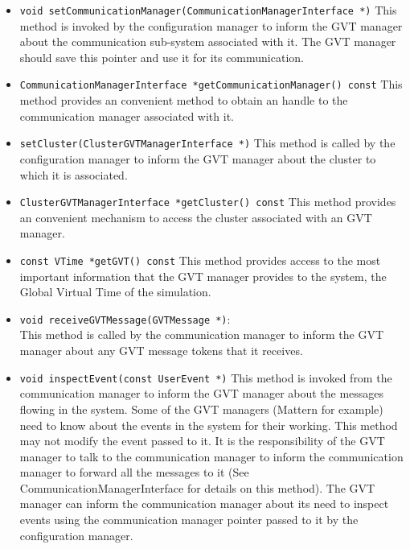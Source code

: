 \begin{itemize}
\item {\tt void setCommunicationManager(CommunicationManagerInterface *)}
  This method is invoked by the configuration manager to inform the GVT
  manager about the communication sub-system associated with it. The GVT
  manager should save this pointer and use it for its communication.

\item {\tt CommunicationManagerInterface *getCommunicationManager() const}
  This method provides an convenient method to obtain an handle to the
  communication manager associated with it.

\item {\tt setCluster(ClusterGVTManagerInterface *)} This method is called
  by the configuration manager to inform the GVT manager about the cluster
  to which it is associated.

\item {\tt ClusterGVTManagerInterface *getCluster() const} This method
  provides an convenient mechanism to access the cluster associated with
  an GVT manager.

\item {\tt const VTime *getGVT() const} This method provides access to the
  most important information that the GVT manager provides to the system,
  the Global Virtual Time of the simulation.

\item {\tt void receiveGVTMessage(GVTMessage *)}:\\
  This method is called by the communication manager to inform the GVT
  manager about any GVT message tokens that it receives.

\item {\tt void inspectEvent(const UserEvent *)} This method is invoked
  from the communication manager to inform the GVT manager about the
  messages flowing in the system. Some of the GVT managers (Mattern for
  example) need to know about the events in the system for their working.
  This method may not modify the event passed to it.  It is the
  responsibility of the GVT manager to talk to the communication manager
  to inform the communication manager to forward all the messages to it
  (See CommunicationManagerInterface for details on this method). The GVT
  manager can inform the communication manager about its need to inspect
  events using the communication manager pointer passed to it by the
  configuration manager.
  
\end{itemize}
  
